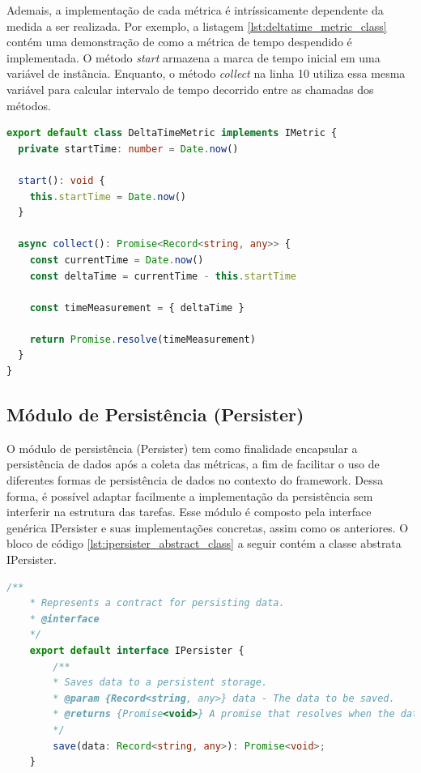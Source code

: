 \documentclass[12pt]{tcc}
\begin{document}
	Ademais, a implementação de cada métrica é intríssicamente dependente da medida a ser realizada.
	Por exemplo, a listagem \ref{lst:deltatime_metric_class} contém uma demonstração de como a métrica de tempo despendido é implementada.
	O método \emph{start} armazena a marca de tempo inicial em uma variável de instância.
	Enquanto, o método \emph{collect} na linha 10 utiliza essa mesma variável para calcular intervalo de tempo decorrido entre as chamadas dos métodos.

\begin{lstlisting}[label={lst:deltatime_metric_class}, caption={Fragmento de código da métrica \emph{DeltaTimeMetric} a qual mede o tempo despendido em milisegundos.}, language=TypeScript, breaklines=true]
export default class DeltaTimeMetric implements IMetric {
  private startTime: number = Date.now()

  start(): void {
    this.startTime = Date.now()
  }

  async collect(): Promise<Record<string, any>> {
    const currentTime = Date.now()
    const deltaTime = currentTime - this.startTime
  
    const timeMeasurement = { deltaTime }
  
    return Promise.resolve(timeMeasurement)
  }
}
\end{lstlisting}


	\subsection{Módulo de Persistência (Persister)}
	\label{subsection:modulo-persister}

	O módulo de persistência (Persister) tem como finalidade encapsular a persistência de dados após a coleta das métricas, a fim de facilitar o uso de diferentes formas de persistência de dados no contexto do framework. Dessa forma, é possível adaptar facilmente a implementação da persistência sem interferir na estrutura das tarefas. Esse módulo é composto pela interface genérica IPersister e suas implementações concretas, assim como os anteriores. O bloco de código \ref{lst:ipersister_abstract_class} a seguir contém a classe abstrata IPersister.

	\begin{lstlisting}[label={lst:ipersister_abstract_class}, caption={Implementação da classe responsável pela persistência dos dados.}, language=TypeScript, breaklines=true]
	/**
	* Represents a contract for persisting data.
	* @interface
	*/
	export default interface IPersister {
		/**
		* Saves data to a persistent storage.
		* @param {Record<string, any>} data - The data to be saved.
		* @returns {Promise<void>} A promise that resolves when the data is saved.
		*/
		save(data: Record<string, any>): Promise<void>;
	}
	\end{lstlisting}
\end{document}
